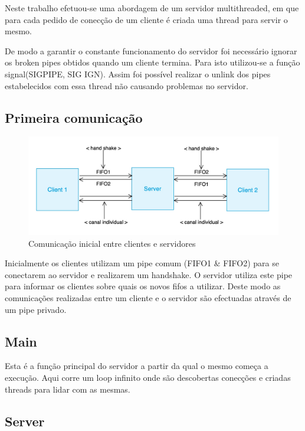 \documentclass{article}
\begin{document}
Neste trabalho efetuou-se uma abordagem de um servidor multithreaded, em que para cada pedido de conecção de um cliente é criada uma thread para servir o mesmo.

De modo a garantir o constante funcionamento do servidor foi necessário ignorar os broken pipes obtidos quando um cliente termina.
Para isto utilizou-se a função signal(SIGPIPE,  SIG IGN). \cite{signal2}
Assim foi possível realizar o unlink dos pipes estabelecidos com essa thread não causando problemas no servidor.

\subsection{Primeira comunicação}
\label{sec:orgf07063a}

\begin{figure}[htbp]
\centering
\includegraphics[width=.9\linewidth]{./img/handshake.jpeg}
\caption{\label{fig:handshake}
Comunicação inicial entre clientes e servidores \cite{Chapter11} \cite{Chapter12}}
\end{figure}

Inicialmente os clientes utilizam um pipe comum (FIFO1 \& FIFO2) para se conectarem ao servidor e realizarem um handshake.
O servidor utiliza este pipe para informar os clientes sobre quais os novos fifos a utilizar.
Deste modo as comunicações realizadas entre um cliente e o servidor são efectuadas através de um pipe privado.

\subsection{Main}
\label{sec:org8837ab5}

Esta é a função principal do servidor a partir da qual o mesmo começa a execução.
Aqui corre um loop infinito onde são descobertas conecções e criadas threads para lidar com as mesmas. \cite{Chapter9}

\subsection{Server}
\label{sec:orgb7f6e05}
\end{document}
